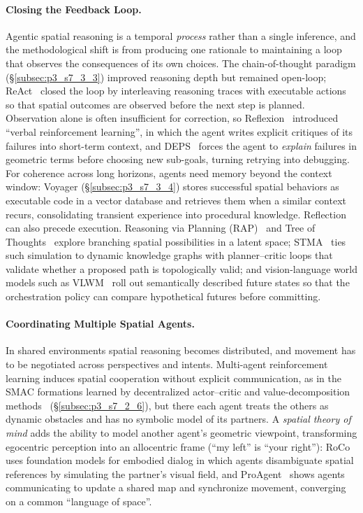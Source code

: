 \paragraph{Closing the Feedback Loop.}
Agentic spatial reasoning is a temporal \emph{process} rather than a single inference, and the methodological shift is from producing one rationale to maintaining a loop that observes the consequences of its own choices.
The chain-of-thought paradigm (§\ref{subsec:p3_s7_3_3}) improved reasoning depth but remained open-loop; ReAct~\cite{yao2022react} closed the loop by interleaving reasoning traces with executable actions so that spatial outcomes are observed before the next step is planned. Observation alone is often insufficient for correction, so Reflexion~\cite{shinn2023reflexion} introduced ``verbal reinforcement learning'', in which the agent writes explicit critiques of its failures into short-term context, and DEPS~\cite{wang2023describe} forces the agent to \emph{explain} failures in geometric terms before choosing new sub-goals, turning retrying into debugging.
For coherence across long horizons, agents need memory beyond the context window: Voyager (§\ref{subsec:p3_s7_3_4}) stores successful spatial behaviors as executable code in a vector database and retrieves them when a similar context recurs, consolidating transient experience into procedural knowledge.
Reflection can also precede execution. Reasoning via Planning (RAP)~\cite{hao2023reasoning} and Tree of Thoughts~\cite{yao2023tot} explore branching spatial possibilities in a latent space; STMA~\cite{lei2025stma} ties such simulation to dynamic knowledge graphs with planner--critic loops that validate whether a proposed path is topologically valid; and vision-language world models such as VLWM~\cite{chen2025vlwm} roll out semantically described future states so that the orchestration policy can compare hypothetical futures before committing.

\paragraph{Coordinating Multiple Spatial Agents.}
In shared environments spatial reasoning becomes distributed, and movement has to be negotiated across perspectives and intents.
Multi-agent reinforcement learning induces spatial cooperation without explicit communication, as in the SMAC formations learned by decentralized actor--critic and value-decomposition methods~\cite{samvelyan2019smac} (§\ref{subsec:p3_s7_2_6}), but there each agent treats the others as dynamic obstacles and has no symbolic model of its partners.
A \emph{spatial theory of mind} adds the ability to model another agent's geometric viewpoint, transforming egocentric perception into an allocentric frame (``my left'' is ``your right''): RoCo~\cite{mandi2024roco} uses foundation models for embodied dialog in which agents disambiguate spatial references by simulating the partner's visual field, and ProAgent~\cite{zhang2024proagent} shows agents communicating to update a shared map and synchronize movement, converging on a common ``language of space''.

